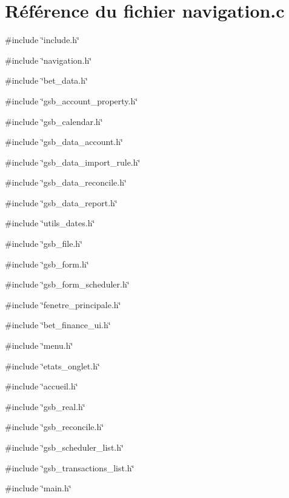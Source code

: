 \section{Référence du fichier navigation.c}
\label{navigation_8c}
{\ttfamily \#include \char`\"{}include.h\char`\"{}}\par
{\ttfamily \#include \char`\"{}navigation.h\char`\"{}}\par
{\ttfamily \#include \char`\"{}bet\_\-data.h\char`\"{}}\par
{\ttfamily \#include \char`\"{}gsb\_\-account\_\-property.h\char`\"{}}\par
{\ttfamily \#include \char`\"{}gsb\_\-calendar.h\char`\"{}}\par
{\ttfamily \#include \char`\"{}gsb\_\-data\_\-account.h\char`\"{}}\par
{\ttfamily \#include \char`\"{}gsb\_\-data\_\-import\_\-rule.h\char`\"{}}\par
{\ttfamily \#include \char`\"{}gsb\_\-data\_\-reconcile.h\char`\"{}}\par
{\ttfamily \#include \char`\"{}gsb\_\-data\_\-report.h\char`\"{}}\par
{\ttfamily \#include \char`\"{}utils\_\-dates.h\char`\"{}}\par
{\ttfamily \#include \char`\"{}gsb\_\-file.h\char`\"{}}\par
{\ttfamily \#include \char`\"{}gsb\_\-form.h\char`\"{}}\par
{\ttfamily \#include \char`\"{}gsb\_\-form\_\-scheduler.h\char`\"{}}\par
{\ttfamily \#include \char`\"{}fenetre\_\-principale.h\char`\"{}}\par
{\ttfamily \#include \char`\"{}bet\_\-finance\_\-ui.h\char`\"{}}\par
{\ttfamily \#include \char`\"{}menu.h\char`\"{}}\par
{\ttfamily \#include \char`\"{}etats\_\-onglet.h\char`\"{}}\par
{\ttfamily \#include \char`\"{}accueil.h\char`\"{}}\par
{\ttfamily \#include \char`\"{}gsb\_\-real.h\char`\"{}}\par
{\ttfamily \#include \char`\"{}gsb\_\-reconcile.h\char`\"{}}\par
{\ttfamily \#include \char`\"{}gsb\_\-scheduler\_\-list.h\char`\"{}}\par
{\ttfamily \#include \char`\"{}gsb\_\-transactions\_\-list.h\char`\"{}}\par
{\ttfamily \#include \char`\"{}main.h\char`\"{}}\par
